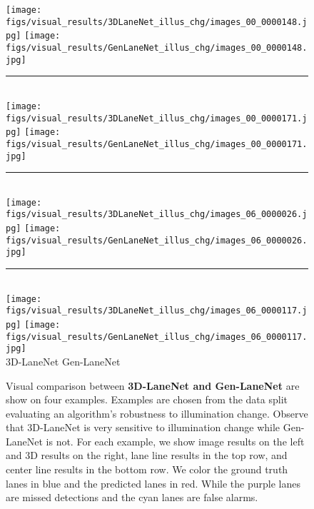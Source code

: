\documentclass[10pt,twocolumn,letterpaper]{article}
\newcommand{\HRule}{\rule{0.8\textwidth}{0.2mm}}
\begin{document}
\begin{figure*}[!h]
  \centering
\texttt{[image: figs/visual\_results/3DLaneNet\_illus\_chg/images\_00\_0000148.jpg]} \hspace{1cm}
  \texttt{[image: figs/visual\_results/GenLaneNet\_illus\_chg/images\_00\_0000148.jpg]}
  \HRule\\
  \texttt{[image: figs/visual\_results/3DLaneNet\_illus\_chg/images\_00\_0000171.jpg]} \hspace{1cm}
  \texttt{[image: figs/visual\_results/GenLaneNet\_illus\_chg/images\_00\_0000171.jpg]}
  \HRule\\
\texttt{[image: figs/visual\_results/3DLaneNet\_illus\_chg/images\_06\_0000026.jpg]} \hspace{1cm}
  \texttt{[image: figs/visual\_results/GenLaneNet\_illus\_chg/images\_06\_0000026.jpg]}
  \HRule\\
  \texttt{[image: figs/visual\_results/3DLaneNet\_illus\_chg/images\_06\_0000117.jpg]} \hspace{1cm}
  \texttt{[image: figs/visual\_results/GenLaneNet\_illus\_chg/images\_06\_0000117.jpg]}\\
  \hspace{10pt} 3D-LaneNet  \hspace{100pt} Gen-LaneNet
\caption{Visual comparison between {\bf 3D-LaneNet and Gen-LaneNet} are show on four examples. Examples are chosen from the data split evaluating an algorithm's robustness to illumination change. Observe that 3D-LaneNet is very sensitive to illumination change while Gen-LaneNet is not. For each example, we show image results on the left and 3D results on the right, lane line results in the top row, and center line results in the bottom row. We color the ground truth lanes in blue and the predicted lanes in red. While the purple lanes are missed detections and the cyan lanes are false alarms.}
  \label{fig:visual:3}
\end{figure*}
\end{document}
